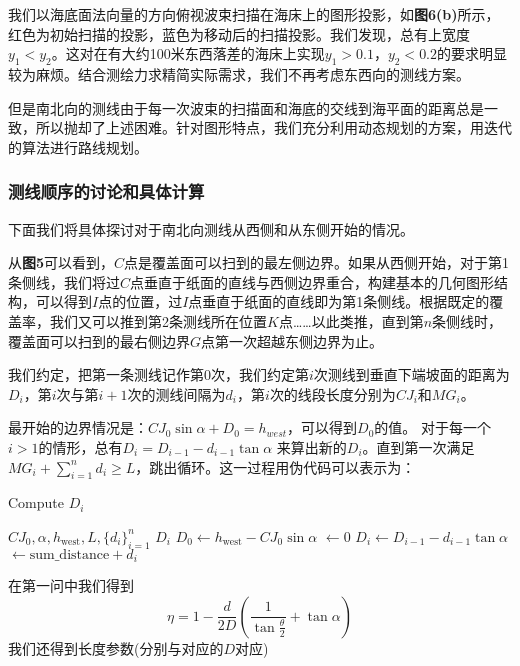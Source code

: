 \documentclass{cumcmthesis}
\begin{document}
我们以海底面法向量的方向俯视波束扫描在海床上的图形投影，如\textbf{图6(b)}所示，红色为初始扫描的投影，蓝色为移动后的扫描投影。我们发现，总有上宽度$y_1<y_2$。这对在有大约100米东西落差的海床上实现$y_1 >0.1$，$y_2<0.2$的要求明显较为麻烦。结合测绘力求精简实际需求，我们不再考虑东西向的测线方案。

但是南北向的测线由于每一次波束的扫描面和海底的交线到海平面的距离总是一致，所以抛却了上述困难。针对图形特点，我们充分利用动态规划的方案，用迭代的算法进行路线规划。

\subsubsection{测线顺序的讨论和具体计算}
下面我们将具体探讨对于南北向测线从西侧和从东侧开始的情况。


从\textbf{图5}可以看到，$C$点是覆盖面可以扫到的最左侧边界。如果从西侧开始，对于第1条侧线，我们将过$C$点垂直于纸面的直线与西侧边界重合，构建基本的几何图形结构，可以得到$I$点的位置，过$I$点垂直于纸面的直线即为第1条侧线。根据既定的覆盖率，我们又可以推到第2条测线所在位置$K$点……以此类推，直到第$n$条侧线时，覆盖面可以扫到的最右侧边界$G$点第一次超越东侧边界为止。



我们约定，把第一条测线记作第$0$次，我们约定第$i$次测线到垂直下端坡面的距离为$D_i$，第$i$次与第$i+1$次的测线间隔为$d_i$，第$i$次的线段长度分别为$CJ_i$和$MG_i$。

最开始的边界情况是：$CJ_0 \sin\alpha + D_0 = h_{west}$，可以得到$D_0$的值。
对于每一个$i>1$的情形，总有$D_i = D_{i-1}-d_{i-1}\tan \alpha$ 来算出新的$D_i$。直到第一次满足$MG_i +\sum_{i=1}^{n}d_i \geq L$，跳出循环。这一过程用伪代码可以表示为：

\begin{algorithm}
\caption{Compute \(D_i\)}
\begin{algorithmic}[1]
\REQUIRE \(CJ_0, \alpha, h_{\text{west}}, L, \{d_i\}_{i=1}^{n}\)
\ENSURE \(D_i\)
\STATE \(D_0 \leftarrow h_{\text{west}} - CJ_0 \sin\alpha\)
\STATE {} \( \leftarrow 0\)
    \STATE \(D_i \leftarrow D_{i-1} - d_{i-1} \tan\alpha\)
    \STATE {} \( \leftarrow \text{sum\_distance} + d_i\)
        \STATE {}
    \ENDIF
\ENDFOR
\end{algorithmic}
\end{algorithm}


在第一问中我们得到
\begin{equation}
\eta = 1 - \frac{d}{2D}(\frac{1}{\tan \frac{\theta}{2}}+\tan\alpha)
\label{q:eq3-1}
\end{equation}
我们还得到长度参数(分别与对应的$D$对应)
\end{document}
